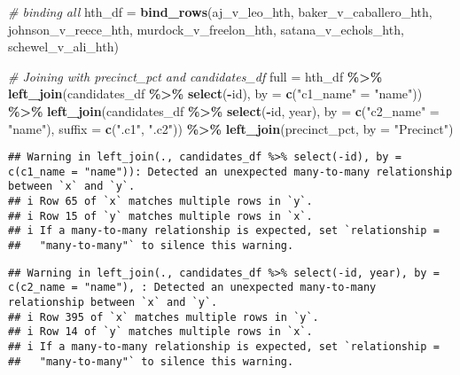 \documentclass[
]{article}
\newenvironment{Shaded}{\begin{snugshade}}{\end{snugshade}}
\newcommand{\AttributeTok}[1]{\textcolor[rgb]{0.13,0.29,0.53}{#1}}
\newcommand{\CommentTok}[1]{\textcolor[rgb]{0.56,0.35,0.01}{\textit{#1}}}
\newcommand{\FunctionTok}[1]{\textcolor[rgb]{0.13,0.29,0.53}{\textbf{#1}}}
\newcommand{\NormalTok}[1]{#1}
\newcommand{\OtherTok}[1]{\textcolor[rgb]{0.56,0.35,0.01}{#1}}
\newcommand{\SpecialCharTok}[1]{\textcolor[rgb]{0.81,0.36,0.00}{\textbf{#1}}}
\newcommand{\StringTok}[1]{\textcolor[rgb]{0.31,0.60,0.02}{#1}}
\begin{document}
\begin{Shaded}
\begin{Highlighting}[]
\CommentTok{\# binding all}
\NormalTok{hth\_df }\OtherTok{=} \FunctionTok{bind\_rows}\NormalTok{(aj\_v\_leo\_hth, baker\_v\_caballero\_hth, johnson\_v\_reece\_hth, murdock\_v\_freelon\_hth, satana\_v\_echols\_hth, schewel\_v\_ali\_hth)}
\end{Highlighting}
\end{Shaded}

\begin{Shaded}
\begin{Highlighting}[]
\CommentTok{\# Joining with precinct\_pct and candidates\_df}
\NormalTok{full }\OtherTok{=}\NormalTok{ hth\_df }\SpecialCharTok{\%\textgreater{}\%}
  \FunctionTok{left\_join}\NormalTok{(candidates\_df }\SpecialCharTok{\%\textgreater{}\%} \FunctionTok{select}\NormalTok{(}\SpecialCharTok{{-}}\NormalTok{id), }\AttributeTok{by =} \FunctionTok{c}\NormalTok{(}\StringTok{"c1\_name"} \OtherTok{=} \StringTok{"name"}\NormalTok{)) }\SpecialCharTok{\%\textgreater{}\%}
  \FunctionTok{left\_join}\NormalTok{(candidates\_df }\SpecialCharTok{\%\textgreater{}\%} \FunctionTok{select}\NormalTok{(}\SpecialCharTok{{-}}\NormalTok{id, year), }\AttributeTok{by =} \FunctionTok{c}\NormalTok{(}\StringTok{"c2\_name"} \OtherTok{=} \StringTok{"name"}\NormalTok{), }\AttributeTok{suffix =} \FunctionTok{c}\NormalTok{(}\StringTok{".c1"}\NormalTok{, }\StringTok{".c2"}\NormalTok{)) }\SpecialCharTok{\%\textgreater{}\%}
  \FunctionTok{left\_join}\NormalTok{(precinct\_pct, }\AttributeTok{by =} \StringTok{"Precinct"}\NormalTok{) }
\end{Highlighting}
\end{Shaded}

\begin{verbatim}
## Warning in left_join(., candidates_df %>% select(-id), by = c(c1_name = "name")): Detected an unexpected many-to-many relationship between `x` and `y`.
## i Row 65 of `x` matches multiple rows in `y`.
## i Row 15 of `y` matches multiple rows in `x`.
## i If a many-to-many relationship is expected, set `relationship =
##   "many-to-many"` to silence this warning.
\end{verbatim}

\begin{verbatim}
## Warning in left_join(., candidates_df %>% select(-id, year), by = c(c2_name = "name"), : Detected an unexpected many-to-many relationship between `x` and `y`.
## i Row 395 of `x` matches multiple rows in `y`.
## i Row 14 of `y` matches multiple rows in `x`.
## i If a many-to-many relationship is expected, set `relationship =
##   "many-to-many"` to silence this warning.
\end{verbatim}
\end{document}
